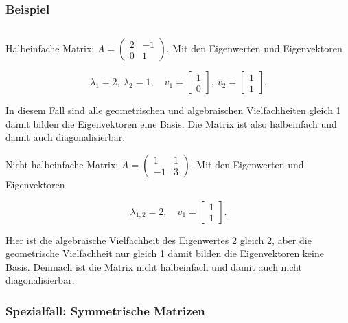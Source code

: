 \subsubsection*{Beispiel} \( \ \)

Halbeinfache Matrix: \( A = \begin{pmatrix} 2 & -1 \\ 0 & 1 \end{pmatrix} \). Mit den Eigenwerten und Eigenvektoren

\vspace{1\baselineskip}

\begin{equation*}
    \lambda_1 = 2, \ \lambda_2 = 1, \quad v_1 = \begin{bmatrix} 1 \\ 0 \end{bmatrix}, \ v_2 = \begin{bmatrix} 1 \\ 1 \end{bmatrix}.
\end{equation*}

In diesem Fall sind alle geometrischen und algebraischen Vielfachheiten gleich 1 damit bilden die Eigenvektoren eine Basis. Die Matrix ist also halbeinfach und damit auch diagonalisierbar.

\vspace{1\baselineskip}

Nicht halbeinfache Matrix: \( A = \begin{pmatrix} 1 & 1 \\ -1 & 3 \end{pmatrix} \). Mit den Eigenwerten und Eigenvektoren

\vspace{1\baselineskip}

\begin{equation*}
    \lambda_{1,2} = 2, \quad v_1 = \begin{bmatrix} 1 \\ 1 \end{bmatrix}.
\end{equation*}

Hier ist die algebraische Vielfachheit des Eigenwertes 2 gleich 2, aber die geometrische Vielfachheit nur gleich 1 damit bilden die Eigenvektoren keine Basis. Demnach ist die Matrix nicht halbeinfach und damit auch nicht diagonalisierbar.

\subsubsection{Spezialfall: Symmetrische Matrizen} \( \ \)

